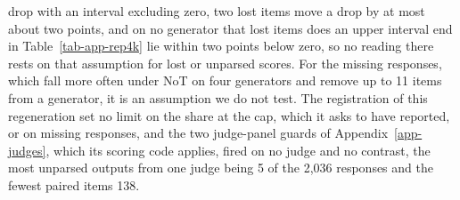 drop with an interval excluding zero, two lost items move a drop by at most
about two points, and on no generator that lost items does an upper interval
end in Table~\ref{tab-app-rep4k} lie within two points below zero, so no
reading there rests on that assumption for lost or unparsed scores. For the
missing responses, which fall more often under NoT on four generators and
remove up to 11 items from a generator, it is an assumption we do not test.
The registration of this regeneration set no limit on the share at the cap,
which it asks to have reported, or on missing responses, and the two
judge-panel guards of Appendix~\ref{app-judges}, which its scoring code
applies, fired on no judge and no contrast, the most unparsed outputs from
one judge being 5 of the 2,036 responses and the fewest paired items 138.
